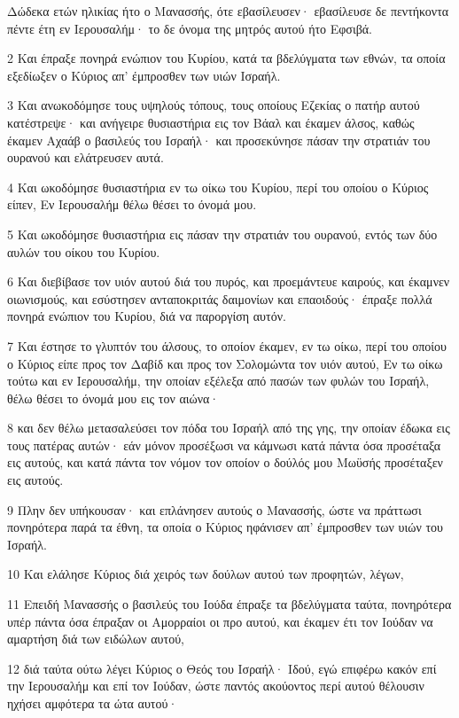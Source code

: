 \par Δώδεκα ετών ηλικίας ήτο ο Μανασσής, ότε εβασίλευσεν· εβασίλευσε δε πεντήκοντα πέντε έτη εν Ιερουσαλήμ· το δε όνομα της μητρός αυτού ήτο Εφσιβά.
\par 2 Και έπραξε πονηρά ενώπιον του Κυρίου, κατά τα βδελύγματα των εθνών, τα οποία εξεδίωξεν ο Κύριος απ' έμπροσθεν των υιών Ισραήλ.
\par 3 Και ανωκοδόμησε τους υψηλούς τόπους, τους οποίους Εζεκίας ο πατήρ αυτού κατέστρεψε· και ανήγειρε θυσιαστήρια εις τον Βάαλ και έκαμεν άλσος, καθώς έκαμεν Αχαάβ ο βασιλεύς του Ισραήλ· και προσεκύνησε πάσαν την στρατιάν του ουρανού και ελάτρευσεν αυτά.
\par 4 Και ωκοδόμησε θυσιαστήρια εν τω οίκω του Κυρίου, περί του οποίου ο Κύριος είπεν, Εν Ιερουσαλήμ θέλω θέσει το όνομά μου.
\par 5 Και ωκοδόμησε θυσιαστήρια εις πάσαν την στρατιάν του ουρανού, εντός των δύο αυλών του οίκου του Κυρίου.
\par 6 Και διεβίβασε τον υιόν αυτού διά του πυρός, και προεμάντευε καιρούς, και έκαμνεν οιωνισμούς, και εσύστησεν ανταποκριτάς δαιμονίων και επαοιδούς· έπραξε πολλά πονηρά ενώπιον του Κυρίου, διά να παροργίση αυτόν.
\par 7 Και έστησε το γλυπτόν του άλσους, το οποίον έκαμεν, εν τω οίκω, περί του οποίου ο Κύριος είπε προς τον Δαβίδ και προς τον Σολομώντα τον υιόν αυτού, Εν τω οίκω τούτω και εν Ιερουσαλήμ, την οποίαν εξέλεξα από πασών των φυλών του Ισραήλ, θέλω θέσει το όνομά μου εις τον αιώνα·
\par 8 και δεν θέλω μετασαλεύσει τον πόδα του Ισραήλ από της γης, την οποίαν έδωκα εις τους πατέρας αυτών· εάν μόνον προσέξωσι να κάμνωσι κατά πάντα όσα προσέταξα εις αυτούς, και κατά πάντα τον νόμον τον οποίον ο δούλός μου Μωϋσής προσέταξεν εις αυτούς.
\par 9 Πλην δεν υπήκουσαν· και επλάνησεν αυτούς ο Μανασσής, ώστε να πράττωσι πονηρότερα παρά τα έθνη, τα οποία ο Κύριος ηφάνισεν απ' έμπροσθεν των υιών του Ισραήλ.
\par 10 Και ελάλησε Κύριος διά χειρός των δούλων αυτού των προφητών, λέγων,
\par 11 Επειδή Μανασσής ο βασιλεύς του Ιούδα έπραξε τα βδελύγματα ταύτα, πονηρότερα υπέρ πάντα όσα έπραξαν οι Αμορραίοι οι προ αυτού, και έκαμεν έτι τον Ιούδαν να αμαρτήση διά των ειδώλων αυτού,
\par 12 διά ταύτα ούτω λέγει Κύριος ο Θεός του Ισραήλ· Ιδού, εγώ επιφέρω κακόν επί την Ιερουσαλήμ και επί τον Ιούδαν, ώστε παντός ακούοντος περί αυτού θέλουσιν ηχήσει αμφότερα τα ώτα αυτού·

